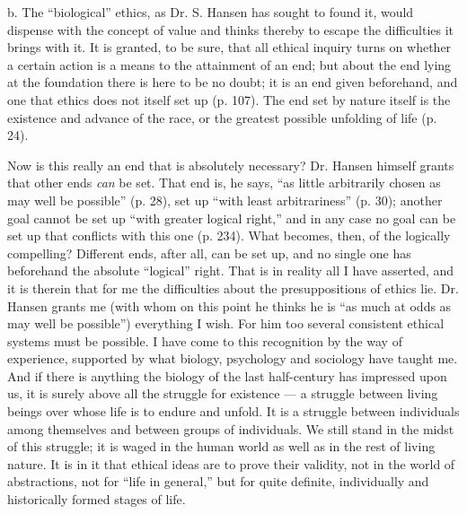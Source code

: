 \documentclass[12pt,a4paper,openany]{book}
\newcommand{\opage}[1]{\marginnote{\footnotesize\textit{[#1]}}}
\begin{document}
b. The ``biological'' ethics, as Dr. S. Hansen has sought to found it, would dispense with the concept of
value and thinks thereby to escape the difficulties it brings with it. It is granted, to be sure, that
all ethical inquiry turns on whether a certain action is a means to the attainment of an end; but about
\opage{73}the end lying at the foundation there is here to be no doubt; it is an end given beforehand, and one
that ethics does not itself set up (p. 107). The end set by nature itself is the existence and advance
of the race, or the greatest possible unfolding of life (p. 24).

Now is this really an end that is absolutely necessary? Dr. Hansen himself grants that other ends
\textit{can} be set. That end is, he says, ``as little arbitrarily chosen as may well be possible''
(p. 28), set up ``with least arbitrariness'' (p. 30); another goal cannot be set up ``with greater
logical right,'' and in any case no goal can be set up that conflicts with this one (p. 234). What
becomes, then, of the logically compelling? Different ends, after all, can be set up, and no single one
has beforehand the absolute ``logical'' right. That is in reality all I have asserted, and it is therein
that for me the difficulties about the presuppositions of ethics lie. Dr. Hansen grants me (with whom
on this point he thinks he is ``as much at odds as may well be possible'') everything I wish. For him
too several consistent ethical systems must be possible. I have come to this recognition by the way of
experience, supported by what biology, psychology and sociology have taught me. And if there is anything
the biology of the last half-century has impressed upon us, it is surely above all the struggle for
existence --- a struggle between living beings over whose life is to endure and unfold. It is a
struggle between individuals among themselves and between groups of individuals. We still stand in the
midst of this struggle; it is waged in the human world as well as in the rest of living nature. It is in
it that ethical ideas are to prove their validity, not in the world of abstractions, not for ``life in
general,'' but for quite definite, individually and historically formed stages of life.
\end{document}
